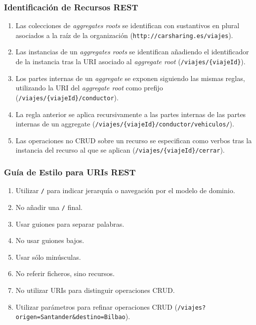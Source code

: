 \documentclass[a4paper,slidestop,xcolor=pst,blue]{beamer}
\begin{document}
\begin{frame}[c]
    \frametitle{Identificación de Recursos REST}
    \begin{enumerate}[<+->]
        \item Las colecciones de \emph{aggregates roots} se identifican con sustantivos en plural asociados a la raíz de la organización (\texttt{http://carsharing.es/viajes}).
        \item Las instancias de un \emph{aggregates roots} se identifican añadiendo el identificador de la instancia tras la URI asociado al \emph{aggregate root}
            (\texttt{/viajes/\{viajeId\}}).
        \item Los partes internas de un \emph{aggregate} se exponen siguiendo las mismas reglas, utilizando la URI del \emph{aggregate root} como prefijo (\texttt{/viajes/\{viajeId\}/conductor}).
        \item La regla anterior se aplica recursivamente a las partes internas de las partes internas de un aggregate (\texttt{/viajes/\{viajeId\}/conductor/vehiculos/}).
        \item Las operaciones no CRUD sobre un recurso se especifican como verbos tras la instancia del recurso al que se aplican (\texttt{/viajes/\{viajeId\}/cerrar}).
    \end{enumerate}
\end{frame}

\begin{frame}[c]
    \frametitle{Guía de Estilo para URIs REST}
    \begin{enumerate}[<+->]
        \item Utilizar \texttt{/} para indicar jerarquía o navegación por el modelo de dominio.
        \item No añadir una \texttt{/} final.
        \item Usar guiones \texttt{\-} para separar palabras.
        \item No usar guiones bajos.
        \item Usar sólo minúsculas.
        \item No referir ficheros, sino recursos.
        \item No utilizar URIs para distinguir operaciones CRUD.
        \item Utilizar parámetros para refinar operaciones CRUD (\texttt{/viajes?origen=Santander\&destino=Bilbao}).
    \end{enumerate}
\end{frame}
\end{document}
